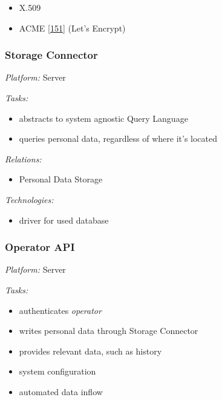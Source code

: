 \documentclass[12pt,english,a4paper,titlepage,cleardoublepage=empty,dottedtoc]{report}
\providecommand{\tightlist}{%
  \setlength{\itemsep}{0pt}\setlength{\parskip}{0pt}}
\begin{document}
\begin{itemize}
\tightlist
\item
  X.509
\item
  ACME {[}\protect\hyperlink{ref-web_spec_acme}{151}{]} (Let's Encrypt)
\end{itemize}

\subsubsection*{Storage Connector}\label{storage-connector}

\emph{Platform:} Server

\emph{Tasks:}

\begin{itemize}
\tightlist
\item
  abstracts to system agnostic Query Language
\item
  queries personal data, regardless of where it's located
\end{itemize}

\emph{Relations:}

\begin{itemize}
\tightlist
\item
  Personal Data Storage
\end{itemize}

\emph{Technologies:}

\begin{itemize}
\tightlist
\item
  driver for used database
\end{itemize}

\subsubsection*{Operator API}\label{operator-api}

\emph{Platform:} Server

\emph{Tasks:}

\begin{itemize}
\tightlist
\item
  authenticates \emph{operator}
\item
  writes personal data through Storage Connector
\item
  provides relevant data, such as history
\item
  system configuration
\item
  automated data inflow
\end{itemize}
\end{document}
